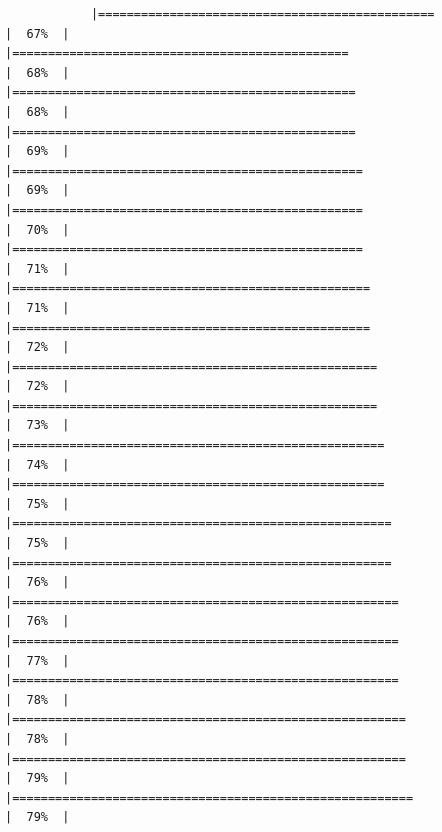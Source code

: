 \documentclass[
]{article}
\begin{document}
\begin{verbatim}
            |===============================================                       |  67%  |                                                                              |===============================================                       |  68%  |                                                                              |================================================                      |  68%  |                                                                              |================================================                      |  69%  |                                                                              |=================================================                     |  69%  |                                                                              |=================================================                     |  70%  |                                                                              |=================================================                     |  71%  |                                                                              |==================================================                    |  71%  |                                                                              |==================================================                    |  72%  |                                                                              |===================================================                   |  72%  |                                                                              |===================================================                   |  73%  |                                                                              |====================================================                  |  74%  |                                                                              |====================================================                  |  75%  |                                                                              |=====================================================                 |  75%  |                                                                              |=====================================================                 |  76%  |                                                                              |======================================================                |  76%  |                                                                              |======================================================                |  77%  |                                                                              |======================================================                |  78%  |                                                                              |=======================================================               |  78%  |                                                                              |=======================================================               |  79%  |                                                                              |========================================================              |  79%  |                                                                   
\end{verbatim}
\end{document}
